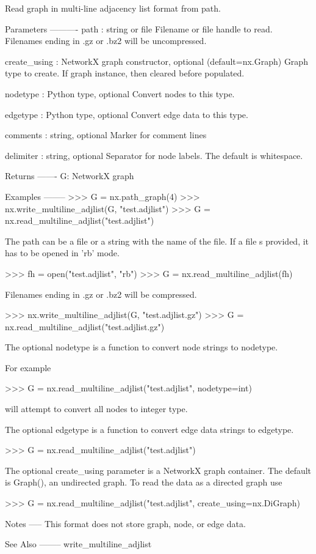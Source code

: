 \begin{DoxyVerb}Read graph in multi-line adjacency list format from path.

Parameters
----------
path : string or file
   Filename or file handle to read.
   Filenames ending in .gz or .bz2 will be uncompressed.

create_using : NetworkX graph constructor, optional (default=nx.Graph)
   Graph type to create. If graph instance, then cleared before populated.

nodetype : Python type, optional
   Convert nodes to this type.

edgetype : Python type, optional
   Convert edge data to this type.

comments : string, optional
   Marker for comment lines

delimiter : string, optional
   Separator for node labels.  The default is whitespace.

Returns
-------
G: NetworkX graph

Examples
--------
>>> G = nx.path_graph(4)
>>> nx.write_multiline_adjlist(G, "test.adjlist")
>>> G = nx.read_multiline_adjlist("test.adjlist")

The path can be a file or a string with the name of the file. If a
file s provided, it has to be opened in 'rb' mode.

>>> fh = open("test.adjlist", "rb")
>>> G = nx.read_multiline_adjlist(fh)

Filenames ending in .gz or .bz2 will be compressed.

>>> nx.write_multiline_adjlist(G, "test.adjlist.gz")
>>> G = nx.read_multiline_adjlist("test.adjlist.gz")

The optional nodetype is a function to convert node strings to nodetype.

For example

>>> G = nx.read_multiline_adjlist("test.adjlist", nodetype=int)

will attempt to convert all nodes to integer type.

The optional edgetype is a function to convert edge data strings to
edgetype.

>>> G = nx.read_multiline_adjlist("test.adjlist")

The optional create_using parameter is a NetworkX graph container.
The default is Graph(), an undirected graph.  To read the data as
a directed graph use

>>> G = nx.read_multiline_adjlist("test.adjlist", create_using=nx.DiGraph)

Notes
-----
This format does not store graph, node, or edge data.

See Also
--------
write_multiline_adjlist
\end{DoxyVerb}
 \mbox{\label{namespacenetworkx_1_1readwrite_1_1multiline__adjlist_a80c0b8a5397ceadc6d8c493ac9007688}} 
